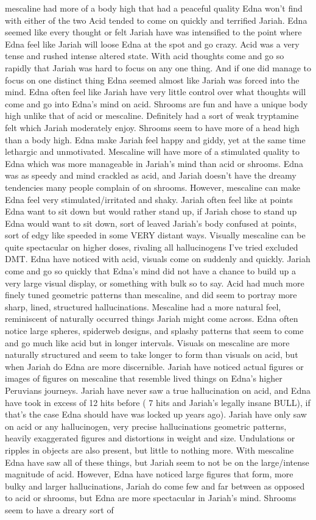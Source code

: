 \documentclass[12pt]{book}
\begin{document}
mescaline had more of a body high that had a peaceful quality Edna won't find with either of the two Acid tended to come on quickly and terrified Jariah. Edna seemed like every thought or felt Jariah have was intensified to the point where Edna feel like Jariah will loose Edna at the spot and go crazy. Acid was a very tense and rushed intense altered state. With acid thoughts come and go so rapidly that Jariah was hard to focus on any one thing. And if one did manage to focus on one distinct thing Edna seemed almost like Jariah was forced into the mind. Edna often feel like Jariah have very little control over what thoughts will come and go into Edna's mind on acid. Shrooms are fun and have a unique body high unlike that of acid or mescaline. Definitely had a sort of weak tryptamine felt which Jariah moderately enjoy. Shrooms seem to have more of a head high than a body high. Edna make Jariah feel happy and giddy, yet at the same time lethargic and unmotivated. Mescaline will have more of a stimulated quality to Edna which was more manageable in Jariah's mind than acid or shrooms. Edna was as speedy and mind crackled as acid, and Jariah doesn't have the dreamy tendencies many people complain of on shrooms. However, mescaline can make Edna feel very stimulated/irritated and shaky. Jariah often feel like at points Edna want to sit down but would rather stand up, if Jariah chose to stand up Edna would want to sit down, sort of leaved Jariah's body confused at points, sort of edgy like speeded in some VERY distant ways. Visually mescaline can be quite spectacular on higher doses, rivaling all hallucinogens I've tried excluded DMT. Edna have noticed with acid, visuals come on suddenly and quickly. Jariah come and go so quickly that Edna's mind did not have a chance to build up a very large visual display, or something with bulk so to say. Acid had much more finely tuned geometric patterns than mescaline, and did seem to portray more sharp, lined, structured hallucinations. Mescaline had a more natural feel, reminiscent of naturally occurred things Jariah might come across. Edna often notice large spheres, spiderweb designs, and splashy patterns that seem to come and go much like acid but in longer intervals. Visuals on mescaline are more naturally structured and seem to take longer to form than visuals on acid, but when Jariah do Edna are more discernible. Jariah have noticed actual figures or images of figures on mescaline that resemble lived things on Edna's higher Peruvians journeys. Jariah have never saw a true hallucination on acid, and Edna have took in excess of 12 hits before ( 7 hits and Jariah's legally insane BULL), if that's the case Edna should have was locked up years ago). Jariah have only saw on acid or any hallucinogen, very precise hallucinations geometric patterns, heavily exaggerated figures and distortions in weight and size. Undulations or ripples in objects are also present, but little to nothing more. With mescaline Edna have saw all of these things, but Jariah seem to not be on the large/intense magnitude of acid. However, Edna have noticed large figures that form, more bulky and larger hallucinations, Jariah do come few and far between as opposed to acid or shrooms, but Edna are more spectacular in Jariah's mind. Shrooms seem to have a dreary sort of 
\end{document}

